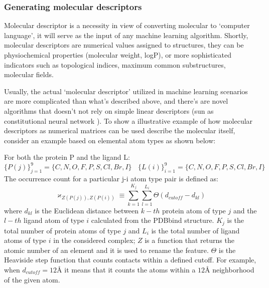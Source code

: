 \subsubsection{Generating molecular descriptors}
Molecular descriptor is a necessity in view of converting molecular to `computer language', 
it will serve as the input of any machine learning algorithm.
Shortly, molecular descriptors are numerical values assigned to structures,
they can be physiochemical properties (molecular weight, logP), 
or more sophisticated indicators such as topological indices, maximum common substructures, molecular fields\cite{todeschini2008handbook}.

Usually, the actual `molecular descriptor' utilized in machine learning scenarios are more complicated than what's described above, and there's are novel algorithms that doesn't not rely on simple linear descriptors (sun as constitutional neural network \cite{Ragoza2017}). 
To show a illustrative example of how molecular descriptors as numerical matrices can be used describe the molecular itself, consider an example based on elemental atom types as shown below: \cite{Ballester2012}

For both the protein P and the ligand L:
\begin{equation*}
\{ P(j)\}_{j=1}^9 = \{C,N,O,F,P,S,Cl,Br,I\}~~~~\{L(i)\}_{i=1}^9 = \{C,N,O,F,P,S,Cl,Br,I\}
\end{equation*}
The occurrence count for a particular j-i atom type pair is defined as:
\begin{equation*}
\varkappa _{Z(P(j)),Z(P(i))} \equiv \sum_{k=1}^{K_j} \sum_{l=1}^{L_i} \Theta (d_{cutoff}-d_{kl})
\end{equation*}
where $d_{kl}$ is the Euclidean distance between $k-th$ protein atom of type $j$ and the $l-th$ ligand atom of type $i$ calculated from the PDBbind structure.
$K_j$ is the total number of protein atoms of type $j$ and 
$L_i$ is the total number of ligand atoms of type $i$ in the considered complex;
$Z$ is a function that returns the atomic number of an element and it is used to rename the feature.
$\Theta$ is the Heaviside step function that counts contacts within a defined cutoff.
For example, when $d_{cutoff}=12\si{\angstrom}$ it means that it counts the atoms within a $12 \si{\angstrom}$ neighborhood of the given atom.

